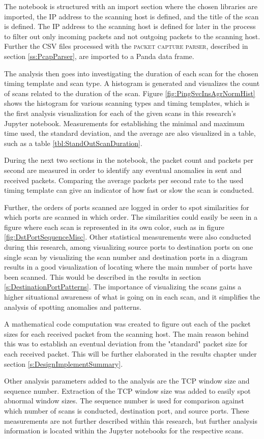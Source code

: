 The notebook is structured with an import section where the chosen libraries are imported, the IP address to the scanning host is defined, and the title of the scan is defined.
The IP address to the scanning host is defined for later in the process to filter out only incoming packets and not outgoing packets to the scanning host.
Further the CSV files processed with the \textsc{packet capture parser}, described in section \ref{ss:PcapParser}, are imported to a Panda data frame.

The analysis then goes into investigating the duration of each scan for the chosen timing template and scan type.
A histogram is generated and visualizes the count of scans related to the duration of the scan.
Figure \ref{fig:PingSvcInsAgrNormHist} shows the histogram for various scanning types and timing templates, which is the first analysis visualization for each of the given scans in this research's Jupyter notebook.
Measurements for establishing the minimal and maximum time used, the standard deviation, and the average are also visualized in a table, such as a table \ref{tbl:StandOutScanDuration}.

During the next two sections in the notebook, the packet count and packets per second are measured in order to identify any eventual anomalies in sent and received packets.
Comparing the average packets per second rate to the used timing template can give an indicator of how fast or slow the scan is conducted.

Further, the orders of ports scanned are logged in order to spot similarities for which ports are scanned in which order.
The similarities could easily be seen in a figure where each scan is represented in its own color, such as in figure \ref{fig:DstPortSequenceMisc}.
Other statistical measurements were also conducted during this research, among visualizing source ports to destination ports on one single scan by visualizing the scan number and destination ports in a diagram results in a good visualization of locating where the main number of ports have been scanned. This would be described in the results in section \ref{s:DestinationPortPatterns}.
The importance of visualizing the scans gains a higher situational awareness of what is going on in each scan, and it simplifies the analysis of spotting anomalies and patterns.

A mathematical code computation was created to figure out each of the packet sizes for each received packet from the scanning host. The main reason behind this was to establish an eventual deviation from the "standard" packet size for each received packet. This will be further elaborated in the results chapter under section \ref{s:DesignImplementSummary}.

Other analysis parameters added to the analysis are the TCP window size and sequence number.
Extraction of the TCP window size was added to easily spot abnormal window sizes.
The sequence number is used for comparison against which number of scans is conducted, destination port, and source ports.
These measurements are not further described within this research, but further analysis information is located within the Jupyter notebooks for the respective scans.
